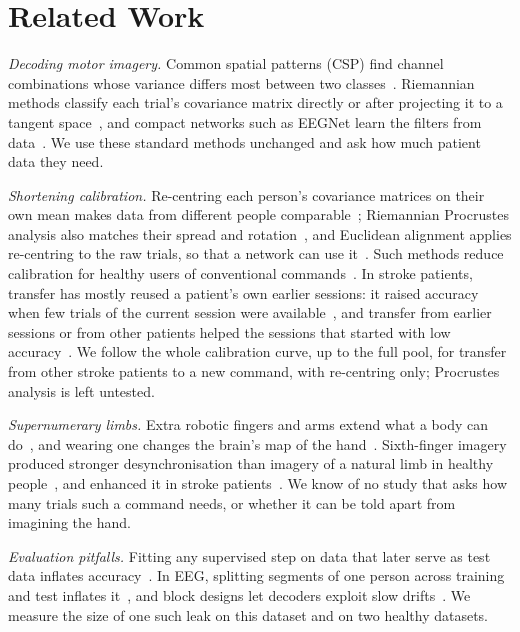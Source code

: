 \section{Related Work}
\label{sec:related}
\emph{Decoding motor imagery.} Common spatial patterns (CSP) find channel
combinations whose variance differs most between two
classes~\cite{ramoser2000,blankertz2008}. Riemannian methods classify each
trial's covariance matrix directly or after projecting it to a tangent
space~\cite{barachant2012,congedo2017}, and compact networks such as EEGNet
learn the filters from data~\cite{lawhern2018}. We use these standard
methods unchanged and ask how much patient data they need.

\emph{Shortening calibration.} Re-centring each person's covariance matrices
on their own mean makes data from different people
comparable~\cite{zanini2018}; Riemannian Procrustes analysis also matches
their spread and rotation~\cite{rodrigues2019}, and Euclidean alignment
applies re-centring to the raw trials, so that a network can use
it~\cite{he2020}. Such methods reduce calibration for healthy users of
conventional commands~\cite{lotte2015,wu2022review}. In stroke patients, transfer has mostly reused a
patient's own earlier sessions: it raised accuracy when few trials of the
current session were available~\cite{giles2022}, and transfer from earlier
sessions or from other patients helped the sessions that started with low
accuracy~\cite{cao2021}. We follow the whole calibration curve, up to the
full pool, for transfer from other stroke patients to a new command, with
re-centring only; Procrustes analysis is left untested.

\emph{Supernumerary limbs.} Extra robotic fingers and arms extend what a body
can do~\cite{prattichizzo2021,eden2022}, and wearing one changes the brain's
map of the hand~\cite{kieliba2021}. Sixth-finger imagery produced stronger
desynchronisation than imagery of a natural limb in healthy
people~\cite{wang2024jbhi}, and enhanced it in stroke
patients~\cite{wang2024tnsre}. We know of no study that asks how many trials
such a command needs, or whether it can be told apart from imagining the
hand.

\emph{Evaluation pitfalls.} Fitting any supervised step on data that later
serve as test data inflates accuracy~\cite{kapoor2023,varoquaux2017}. In
EEG, splitting segments of one person across training and test inflates
it~\cite{brookshire2024}, and block designs let decoders exploit slow
drifts~\cite{li2021perils}. We measure the size of one such leak on this
dataset and on two healthy datasets.
